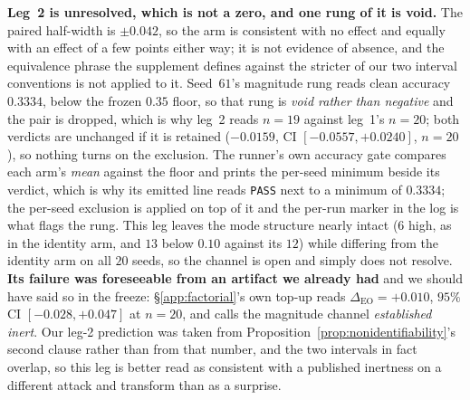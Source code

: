 \documentclass{article}
\begin{document}
\textbf{Leg~2 is unresolved, which is not a zero, and one rung of it is void.} The paired half-width is $\pm0.042$, so the arm is consistent with no effect and equally with an effect of a few points either way; it is not evidence of absence, and the equivalence phrase the supplement defines against the stricter of our two interval conventions is not applied to it. Seed~$61$'s magnitude rung reads clean accuracy $0.3334$, below the frozen $0.35$ floor, so that rung is \emph{void rather than negative} and the pair is dropped, which is why leg~2 reads $n{=}19$ against leg~1's $n{=}20$; both verdicts are unchanged if it is retained ($-0.0159$, CI $[-0.0557,+0.0240]$, $n{=}20$), so nothing turns on the exclusion. The runner's own accuracy gate compares each arm's \emph{mean} against the floor and prints the per-seed minimum beside its verdict, which is why its emitted line reads \texttt{PASS} next to a minimum of $0.3334$; the per-seed exclusion is applied on top of it and the per-run marker in the log is what flags the rung. This leg leaves the mode structure nearly intact ($6$ high, as in the identity arm, and $13$ below $0.10$ against its $12$) while differing from the identity arm on all $20$ seeds, so the channel is open and simply does not resolve. \textbf{Its failure was foreseeable from an artifact we already had} and we should have said so in the freeze: §\ref{app:factorial}'s own top-up reads $\Delta_{\mathrm{EO}} = +0.010$, $95\%$ CI $[-0.028,+0.047]$ at $n{=}20$, and calls the magnitude channel \emph{established inert}. Our leg-2 prediction was taken from Proposition~\ref{prop:nonidentifiability}'s second clause rather than from that number, and the two intervals in fact overlap, so this leg is better read as consistent with a published inertness on a different attack and transform than as a surprise.
\end{document}
